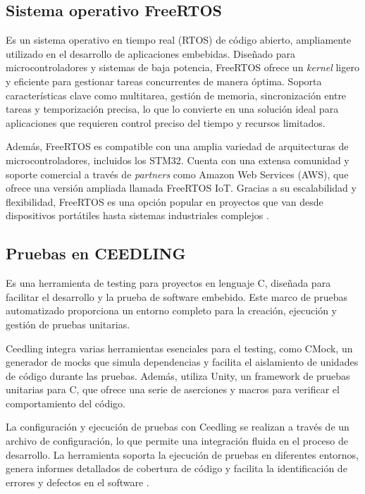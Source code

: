 \subsection{Sistema operativo FreeRTOS}
\label{subsec:FreeRTOS}

Es un sistema operativo en tiempo real (RTOS) de código abierto, ampliamente utilizado en el desarrollo de aplicaciones embebidas. Diseñado para microcontroladores y sistemas de baja potencia, FreeRTOS ofrece un \textit{kernel} ligero y eficiente para gestionar tareas concurrentes de manera óptima. Soporta características clave como multitarea, gestión de memoria, sincronización entre tareas y temporización precisa, lo que lo convierte en una solución ideal para aplicaciones que requieren control preciso del tiempo y recursos limitados.

Además, FreeRTOS es compatible con una amplia variedad de arquitecturas de microcontroladores, incluidos los STM32. Cuenta con una extensa comunidad y soporte comercial a través de \textit{partners} como Amazon Web Services (AWS), que ofrece una versión ampliada llamada FreeRTOS IoT. Gracias a su escalabilidad y flexibilidad, FreeRTOS es una opción popular en proyectos que van desde dispositivos portátiles hasta sistemas industriales complejos \citep{WEBSITE:freertos}.

\subsection{Pruebas en CEEDLING}
\label{subsec:CEEDLING}

Es una herramienta de testing para proyectos en lenguaje C, diseñada para facilitar el desarrollo y la prueba de software embebido. Este marco de pruebas automatizado proporciona un entorno completo para la creación, ejecución y gestión de pruebas unitarias.

Ceedling integra varias herramientas esenciales para el testing, como CMock, un generador de mocks que simula dependencias y facilita el aislamiento de unidades de código durante las pruebas. Además, utiliza Unity, un framework de pruebas unitarias para C, que ofrece una serie de aserciones y macros para verificar el comportamiento del código.

La configuración y ejecución de pruebas con Ceedling se realizan a través de un archivo de configuración, lo que permite una integración fluida en el proceso de desarrollo. La herramienta soporta la ejecución de pruebas en diferentes entornos, genera informes detallados de cobertura de código y facilita la identificación de errores y defectos en el software \citep{WEBSITE:CEEDLING}.

